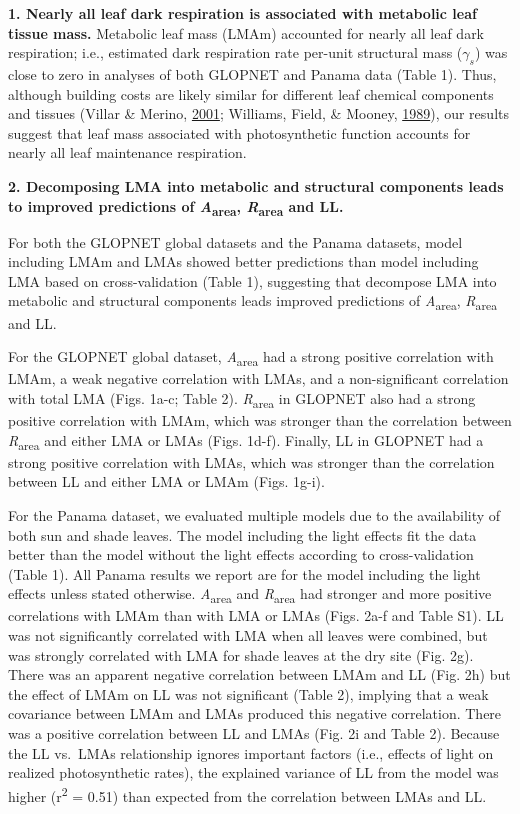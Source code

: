 \documentclass[12pt,]{article}
\theoremstyle{definition}
\theoremstyle{definition}
\theoremstyle{definition}
\theoremstyle{remark}
\begin{document}
\textbf{1. Nearly all leaf dark respiration is associated with metabolic
leaf tissue mass.} Metabolic leaf mass (LMAm) accounted for nearly all
leaf dark respiration; i.e., estimated dark respiration rate per-unit
structural mass (\(\gamma_s\)) was close to zero in analyses of both
GLOPNET and Panama data (Table 1). Thus, although building costs are
likely similar for different leaf chemical components and tissues
(Villar \& Merino, \protect\hyperlink{ref-Villar2001}{2001}; Williams,
Field, \& Mooney, \protect\hyperlink{ref-Williams1989}{1989}), our
results suggest that leaf mass associated with photosynthetic function
accounts for nearly all leaf maintenance respiration.

\textbf{2. Decomposing LMA into metabolic and structural components
leads to improved predictions of \emph{A}\textsubscript{area},
\emph{R}\textsubscript{area} and LL.}

For both the GLOPNET global datasets and the Panama datasets, model
including LMAm and LMAs showed better predictions than model including
LMA based on cross-validation (Table 1), suggesting that decompose LMA
into metabolic and structural components leads improved predictions of
\emph{A}\textsubscript{area}, \emph{R}\textsubscript{area} and LL.

For the GLOPNET global dataset, \emph{A}\textsubscript{area} had a
strong positive correlation with LMAm, a weak negative correlation with
LMAs, and a non-significant correlation with total LMA (Figs. 1a-c;
Table 2). \emph{R}\textsubscript{area} in GLOPNET also had a strong
positive correlation with LMAm, which was stronger than the correlation
between \emph{R}\textsubscript{area} and either LMA or LMAs (Figs.
1d-f). Finally, LL in GLOPNET had a strong positive correlation with
LMAs, which was stronger than the correlation between LL and either LMA
or LMAm (Figs. 1g-i).

For the Panama dataset, we evaluated multiple models due to the
availability of both sun and shade leaves. The model including the light
effects fit the data better than the model without the light effects
according to cross-validation (Table 1). All Panama results we report
are for the model including the light effects unless stated otherwise.
\emph{A}\textsubscript{area} and \emph{R}\textsubscript{area} had
stronger and more positive correlations with LMAm than with LMA or LMAs
(Figs. 2a-f and Table S1). LL was not significantly correlated with LMA
when all leaves were combined, but was strongly correlated with LMA for
shade leaves at the dry site (Fig. 2g). There was an apparent negative
correlation between LMAm and LL (Fig. 2h) but the effect of LMAm on LL
was not significant (Table 2), implying that a weak covariance between
LMAm and LMAs produced this negative correlation. There was a positive
correlation between LL and LMAs (Fig. 2i and Table 2). Because the LL
vs.~LMAs relationship ignores important factors (i.e., effects of light
on realized photosynthetic rates), the explained variance of LL from the
model was higher (r\textsuperscript{2} = 0.51) than expected from the
correlation between LMAs and LL.
\end{document}

